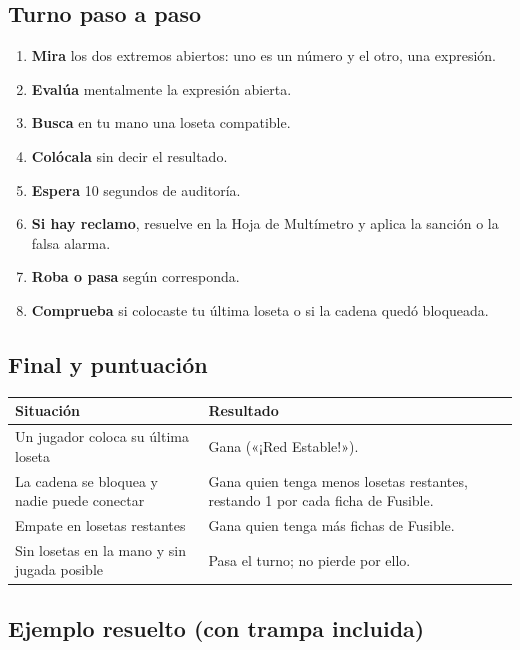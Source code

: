 \documentclass[12pt, letterpaper]{article}
\begin{document}
\subsection{Turno paso a paso}

\begin{enumerate}[leftmargin=*]
  \item \textbf{Mira} los dos extremos abiertos: uno es un número y el otro, una expresión.
  \item \textbf{Evalúa} mentalmente la expresión abierta.
  \item \textbf{Busca} en tu mano una loseta compatible.
  \item \textbf{Colócala} sin decir el resultado.
  \item \textbf{Espera} 10 segundos de auditoría.
  \item \textbf{Si hay reclamo}, resuelve en la Hoja de Multímetro y aplica la sanción o la falsa alarma.
  \item \textbf{Roba o pasa} según corresponda.
  \item \textbf{Comprueba} si colocaste tu última loseta o si la cadena quedó bloqueada.
\end{enumerate}

\subsection{Final y puntuación}

\begin{center}
\small
\begin{tabular}{@{}p{7.2cm} p{6.8cm}@{}}
\toprule
\textbf{Situación} & \textbf{Resultado}\\
\midrule
Un jugador coloca su última loseta & Gana («¡Red Estable!»).\\
La cadena se bloquea y nadie puede conectar & Gana quien tenga menos losetas restantes, restando 1 por cada ficha de Fusible.\\
Empate en losetas restantes & Gana quien tenga más fichas de Fusible.\\
Sin losetas en la mano y sin jugada posible & Pasa el turno; no pierde por ello.\\
\bottomrule
\end{tabular}
\end{center}

\subsection{Ejemplo resuelto (con trampa incluida)}
\end{document}
